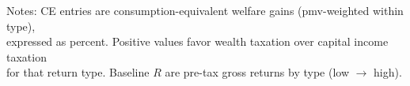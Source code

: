 
\begin{table}[!htbp]
\centering
\caption{Per-Type Welfare Gain and Baseline Return (WT vs CIT)}
\label{tab:ce_per_type_wt_vs_cit}
\begin{threeparttable}

\begin{minipage}{\linewidth}
\centering
{} %
\end{minipage}

\begin{tablenotes}[flushleft]
\footnotesize
\item Notes: CE entries are consumption-equivalent welfare gains (pmv-weighted within type),\\
  expressed as percent. Positive values favor wealth taxation over capital income taxation \\
  for that return type. Baseline $R$ are pre-tax gross returns by type (low $\rightarrow$ high).
\end{tablenotes}
\end{threeparttable}
\end{table}
